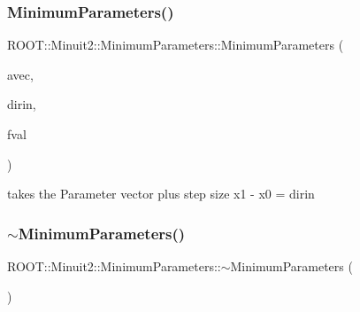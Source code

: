\subsubsection{\texorpdfstring{MinimumParameters()}{MinimumParameters()}\hspace{0.1cm}{\footnotesize\ttfamily [11/12]}}
{\footnotesize\ttfamily R\+O\+O\+T\+::\+Minuit2\+::\+Minimum\+Parameters\+::\+Minimum\+Parameters (\begin{DoxyParamCaption}\item[{const \mbox{\hyperlink{namespaceROOT_1_1Minuit2_a62ed97730a1ca8d3fbaec64a19aa11c9}{Mn\+Algebraic\+Vector}} \&}]{avec,  }\item[{const \mbox{\hyperlink{namespaceROOT_1_1Minuit2_a62ed97730a1ca8d3fbaec64a19aa11c9}{Mn\+Algebraic\+Vector}} \&}]{dirin,  }\item[{double}]{fval }\end{DoxyParamCaption})\hspace{0.3cm}{\ttfamily [inline]}}

takes the Parameter vector plus step size x1 -\/ x0 = dirin \mbox{\label{classROOT_1_1Minuit2_1_1MinimumParameters_a1e7d7b8ed914bec0a2e4f68642b9a377}} 
\subsubsection{\texorpdfstring{$\sim$MinimumParameters()}{~MinimumParameters()}\hspace{0.1cm}{\footnotesize\ttfamily [3/3]}}
{\footnotesize\ttfamily R\+O\+O\+T\+::\+Minuit2\+::\+Minimum\+Parameters\+::$\sim$\+Minimum\+Parameters (\begin{DoxyParamCaption}{ }\end{DoxyParamCaption})\hspace{0.3cm}{\ttfamily [inline]}}

\mbox{\label{classROOT_1_1Minuit2_1_1MinimumParameters_a5cea4660328847c3eb5ebc48041acc4c}} 
